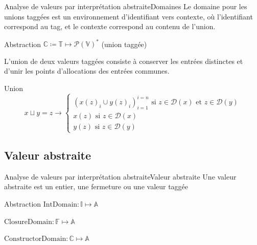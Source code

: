 \documentclass{beamer}
\begin{document}
\begin{frame}{Analyse de valeurs par interprétation abstraite}{Domaines}
    Le domaine pour les unions taggées est un environnement d'identifiant vers contexte, où l'identifiant correspond au tag, et le contexte correspond au contenu de l'union.

    \begin{block}{Abstraction}
        $\mathbb{C} \coloneqq \mathbb{T} \mapsto \mathcal{P}(\mathbb{V})^{*}$ (union taggée)
    \end{block}

    L'union de deux valeurs taggées consiste à conserver les entrées distinctes et d'unir les points d'allocations des entrées communes.%
    
    \begin{block}{Union}
        $$
        x \sqcup y = z \rightarrow
        \begin{cases}
            \left( x(z)_i \cup y(z)_i \right)_{i=1}^{i=n} \text{ si } z \in \mathcal{D}(x) \text{ et } z \in \mathcal{D}(y) \\
            x(z) \text{ si } z \in \mathcal{D}(x) \\
            y(z) \text{ si } z \in \mathcal{D}(y)
        \end{cases}
        $$
    \end{block}
\end{frame}

\subsection{Valeur abstraite}

\begin{frame}{Analyse de valeurs par interprétation abstraite}{Valeur abstraite}
    Une valeur abstraite est un entier, une fermeture ou une valeur taggée

    \begin{block}{Abstraction}
        $\text{IntDomain} : \mathbb{I} \mapsto \mathbb{A}$

        $\text{ClosureDomain} : \mathbb{F} \mapsto \mathbb{A}$

        $\text{ConstructorDomain} : \mathbb{C} \mapsto \mathbb{A}$
    \end{block}
\end{frame}

\fi
\end{document}
